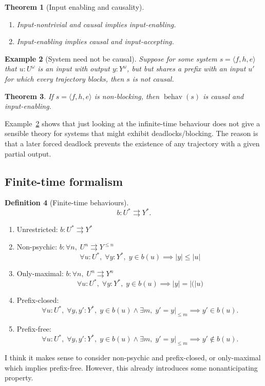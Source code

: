 \documentclass[11pt,a4paper]{article}
\newcommand{\mvto}{\rightrightarrows}
\newcommand{\len}[1]{{|#1|}}
\DeclareMathOperator{\behav}{\mathrm{behav}}
\theoremstyle{theorem}
\newtheorem{theorem}{Theorem} %
\newtheorem{counterexample}[theorem]{Example}
\theoremstyle{definition}
\newtheorem{definition}[theorem]{Definition}
\theoremstyle{remark}
\begin{document}
\begin{theorem}[Input enabling and causality]
\mbox{}
\begin{enumerate}
\item Input-nontrivial and causal implies input-enabling.
\item Input-enabling implies causal and input-accepting.
\end{enumerate}
\end{theorem}

\begin{counterexample}[System need not be causal]
\label{ex:blockingnoncausal}
Suppose for some system $s=\langle f,h,e\rangle$ that $u:U^\omega$ is an input with output $y:Y^\omega$, but  but shares a prefix with an input $u'$ for which every trajectory blocks, then $s$ is not causal.
\end{counterexample}

\begin{theorem}
If $s=\langle f,h,e\rangle$ is non-blocking, then $\behav(s)$ is causal and input-enabling.
\end{theorem}

Example~\ref{ex:blockingnoncausal} shows that just looking at the infinite-time behaviour does not give a sensible theory for systems that might exhibit deadlocks/blocking. The reason is that a later forced deadlock prevents the existence of any trajectory with a given partial output.


\subsection{Finite-time formalism}

\begin{definition}[Finite-time behaviours]
\[ b: U^* \mvto Y^* . \]
\begin{enumerate}
\item Unrestricted: \( b : U^* \mvto Y^* \)
\item Non-psychic: \( b : \forall n,\; U^n \mvto Y^{\leq n} \)
  \[ \forall u:U^*,\; \forall y:Y^*,\; y \in b(u) \implies \len{y} \leq \len{u} \]
\item Only-maximal: \( b : \forall n,\; U^n \mvto Y^{n} \)
  \[ \forall u:U^*,\;\forall y:Y^*,\; y \in b(u) \implies \len{y} = \len(u) \]
\item Prefix-closed: \[ \forall u:U^*,\;\forall y,y':Y^*,\; y \in b(u) \wedge \exists m,\; y'=y|_{\leq m} \implies y' \in b(u) . \]
\item Prefix-free: \[ \forall u:U^*,\;\forall y,y':Y^*,\; y \in b(u) \wedge \exists m,\; y'=y|_{\leq m} \implies y' \not\in b(u) . \]
\end{enumerate}
\end{definition}
I think it makes sense to consider non-psychic and prefix-closed, or only-maximal which implies prefix-free. However, this already introduces some nonanticipating property.
\end{document}
